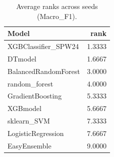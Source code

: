 \begin{table}[t]
\centering
\begin{tabular}{lr}
\toprule
Model & rank \\
\midrule
XGBClassifier_SPW24 & 1.3333 \\
DTmodel & 1.6667 \\
BalancedRandomForest & 3.0000 \\
random_forest & 4.0000 \\
GradientBoosting & 5.3333 \\
XGBmodel & 5.6667 \\
sklearn_SVM & 7.3333 \\
LogisticRegression & 7.6667 \\
EasyEnsemble & 9.0000 \\
\bottomrule
\end{tabular}
\caption{Average ranks across seeds (Macro_F1).}
\label{tab:avg_rank_Macro_F1}
\end{table}